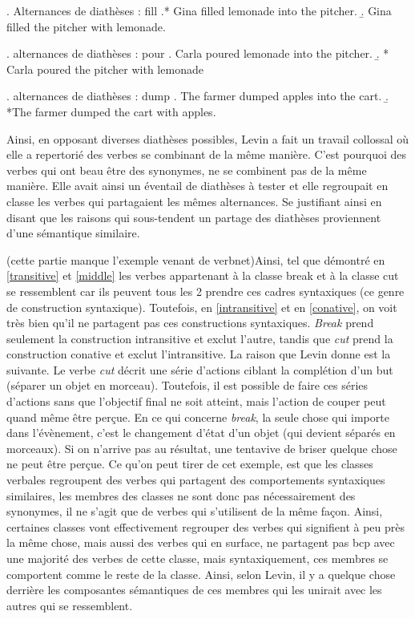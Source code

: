 \ex. \label{fill} Alternances de diathèses : fill
	\a.* Gina filled lemonade into the pitcher. 
	\b. Gina filled the pitcher with lemonade. 

\ex. \label{pour} alternances de diathèses : pour
	\a. Carla poured lemonade into the pitcher. 
	\b. * Carla poured the pitcher with lemonade

\ex. \label{dump} alternances de diathèses : dump
	\a. The farmer dumped apples into the cart. 
	\b. *The farmer dumped the cart with apples. 
	
Ainsi, en opposant diverses diathèses possibles, Levin a fait un travail collossal où elle a repertorié des verbes se combinant de la même manière. C'est pourquoi des verbes qui ont beau être des synonymes, ne se combinent pas de la même manière. Elle avait ainsi un éventail de diathèses à tester et elle regroupait en classe les verbes qui partagaient les mêmes alternances. Se justifiant ainsi en disant que les raisons qui sous-tendent un partage des diathèses proviennent d'une sémantique similaire. 

(cette partie manque l'exemple venant de verbnet)Ainsi, tel que démontré en \ref{transitive} et \ref{middle} les verbes appartenant à la classe break et à la classe cut se ressemblent car ils peuvent tous les 2 prendre ces cadres syntaxiques (ce genre de construction syntaxique). Toutefois, en \ref{intransitive} et en \ref{conative}, on voit très bien qu'il ne partagent pas ces constructions syntaxiques. \emph{Break} prend seulement la construction intransitive et exclut l'autre, tandis que \emph{cut} prend la construction conative et exclut l'intransitive. La raison que Levin donne est la suivante. Le verbe \emph{cut} décrit une série d'actions ciblant la complétion d'un but (séparer un objet en morceau). Toutefois, il est possible de faire ces séries d'actions sans que l'objectif final ne soit atteint, mais l'action de couper peut quand même être perçue. En ce qui concerne \emph{break}, la seule chose qui importe dans l'évènement, c'est le changement d'état d'un objet (qui devient séparés en morceaux). Si on n'arrive pas au résultat, une tentavive de briser quelque chose ne peut être perçue. Ce qu'on peut tirer de cet exemple, est que les classes verbales regroupent des verbes qui partagent des comportements syntaxiques similaires, les membres des classes ne sont donc pas nécessairement des synonymes, il ne s'agit que de verbes qui s'utilisent de la même façon. Ainsi, certaines classes vont effectivement regrouper des verbes qui signifient à peu près la même chose, mais aussi des verbes qui en surface, ne partagent pas bcp avec une majorité des verbes de cette classe, mais syntaxiquement, ces membres se comportent comme le reste de la classe. Ainsi, selon Levin, il y a quelque chose derrière les composantes sémantiques de ces membres qui les unirait avec les autres qui se ressemblent.

